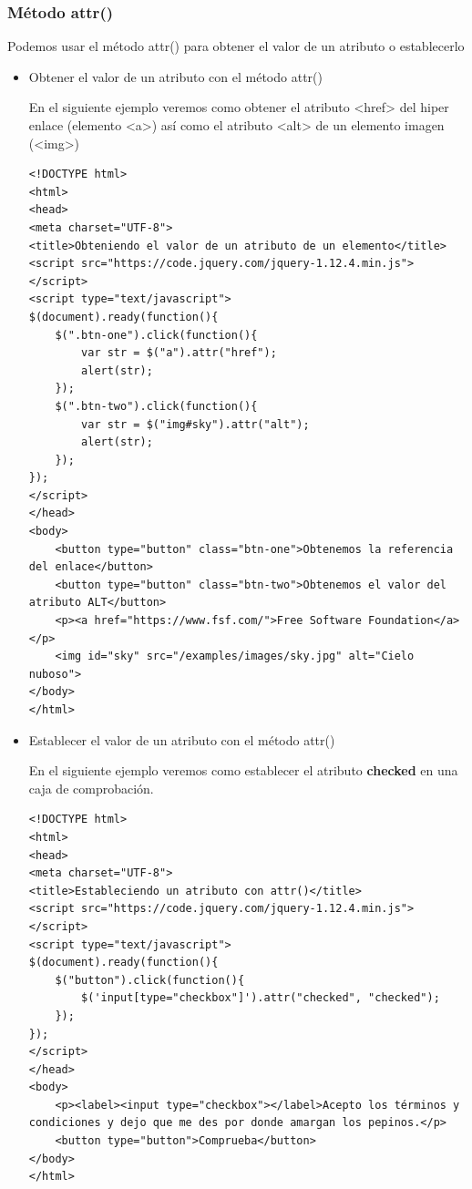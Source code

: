 \documentclass[11pt]{article}
\begin{document}
\subsubsection*{Método attr()}
\label{sec:org392a197}

Podemos usar el método attr() para obtener el valor de un atributo o establecerlo

\begin{itemize}
\item Obtener el valor de un atributo con el método attr()
\label{sec:org5db96ee}

En el siguiente ejemplo veremos como obtener el atributo <href> del hiper enlace (elemento <a>) así como el atributo <alt> de un elemento imagen (<img>)

\begin{verbatim}
<!DOCTYPE html>
<html>
<head>
<meta charset="UTF-8">
<title>Obteniendo el valor de un atributo de un elemento</title>
<script src="https://code.jquery.com/jquery-1.12.4.min.js"></script>
<script type="text/javascript">
$(document).ready(function(){
    $(".btn-one").click(function(){
        var str = $("a").attr("href");
        alert(str);
    });
    $(".btn-two").click(function(){
        var str = $("img#sky").attr("alt");
        alert(str);
    });
});
</script>
</head>
<body>
    <button type="button" class="btn-one">Obtenemos la referencia del enlace</button>
    <button type="button" class="btn-two">Obtenemos el valor del atributo ALT</button>
    <p><a href="https://www.fsf.com/">Free Software Foundation</a></p>
    <img id="sky" src="/examples/images/sky.jpg" alt="Cielo nuboso">
</body>
</html>                                		
\end{verbatim}

\item Establecer el valor de un atributo con el método attr()
\label{sec:orgc73a873}

En el siguiente ejemplo veremos como establecer el atributo \textbf{checked} en una caja de comprobación.

\begin{verbatim}
<!DOCTYPE html>
<html>
<head>
<meta charset="UTF-8">
<title>Estableciendo un atributo con attr()</title>
<script src="https://code.jquery.com/jquery-1.12.4.min.js"></script>
<script type="text/javascript">
$(document).ready(function(){
    $("button").click(function(){
        $('input[type="checkbox"]').attr("checked", "checked");
    });
});
</script>
</head>
<body>
    <p><label><input type="checkbox"></label>Acepto los términos y condiciones y dejo que me des por donde amargan los pepinos.</p>
    <button type="button">Comprueba</button>
</body>
</html>                                		
\end{verbatim}
\end{itemize}
\end{document}
